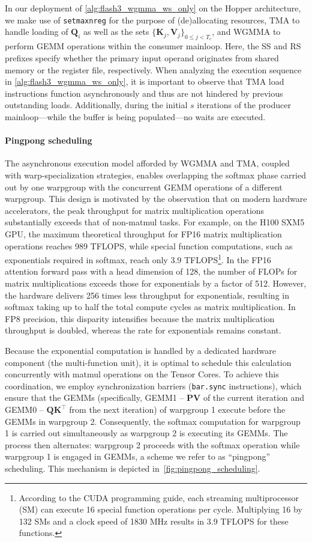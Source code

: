 In our deployment of \cref{alg:flash3_wgmma_ws_only} on the Hopper architecture, we make use of \verb|setmaxnreg| for the purpose of (de)allocating resources, TMA to handle loading of $\mathbf{Q}_i$ as well as the sets $\{ \mathbf{K}_j, \mathbf{V}_j \}_{0 \leq j < T_c}$, and WGMMA to perform GEMM operations within the consumer mainloop. Here, the SS and RS prefixes specify whether the primary input operand originates from shared memory or the register file, respectively. When analyzing the execution sequence in \cref{alg:flash3_wgmma_ws_only}, it is important to observe that TMA load instructions function asynchronously and thus are not hindered by previous outstanding loads. Additionally, during the initial $s$ iterations of the producer mainloop—while the buffer is being populated—no waits are executed.

\paragraph{Pingpong scheduling} The asynchronous execution model afforded by WGMMA and TMA, coupled with warp-specialization strategies, enables overlapping the softmax phase carried out by one warpgroup with the concurrent GEMM operations of a different warpgroup. This design is motivated by the observation that on modern hardware accelerators, the peak throughput for matrix multiplication operations substantially exceeds that of non-matmul tasks. For example, on the H100 SXM5 GPU, the maximum theoretical throughput for FP16 matrix multiplication operations reaches 989 TFLOPS, while special function computations, such as exponentials required in softmax, reach only 3.9 TFLOPS\footnote{According to the CUDA programming guide, each streaming multiprocessor (SM) can execute 16 special function operations per cycle. Multiplying 16 by 132 SMs and a clock speed of 1830 MHz results in 3.9 TFLOPS for these functions.}. In the FP16 attention forward pass with a head dimension of 128, the number of FLOPs for matrix multiplications exceeds those for exponentials by a factor of 512. However, the hardware delivers 256 times less throughput for exponentials, resulting in softmax taking up to half the total compute cycles as matrix multiplication. In FP8 precision, this disparity intensifies because the matrix multiplication throughput is doubled, whereas the rate for exponentials remains constant.

Because the exponential computation is handled by a dedicated hardware component (the multi-function unit), it is optimal to schedule this calculation concurrently with matmul operations on the Tensor Cores. To achieve this coordination, we employ synchronization barriers (\texttt{bar.sync} instructions), which ensure that the GEMMs (specifically, GEMM1 -- $\mathbf{P} \mathbf{V}$ of the current iteration and GEMM0 -- $\mathbf{Q} \mathbf{K}^\top$ from the next iteration) of warpgroup 1 execute before the GEMMs in warpgroup 2. Consequently, the softmax computation for warpgroup 1 is carried out simultaneously as warpgroup 2 is executing its GEMMs. The process then alternates: warpgroup 2 proceeds with the softmax operation while warpgroup 1 is engaged in GEMMs, a scheme we refer to as ``pingpong'' scheduling. This mechanism is depicted in~\cref{fig:pingpong_scheduling}. 

